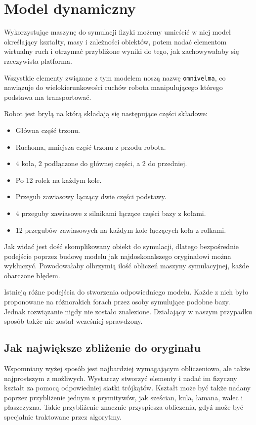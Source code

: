 \section{Model dynamiczny}
	\label{sec:omnivelma}
	Wykorzystując maszynę do symulacji fizyki możemy umieścić w niej model określający kształty, masy i zależności obiektów, potem nadać elementom wirtualny ruch i otrzymać przybliżone wyniki do tego, jak zachowywałaby się rzeczywista platforma.

	Wszystkie elementy związane z tym modelem noszą nazwę \texttt{omnivelma}, co nawiązuje do wielokierunkowości ruchów robota manipulującego którego podstawa ma transportować.

	Robot jest bryłą na którą składają się następujące części składowe:
	\begin{itemize}
	\item Główna część trzonu.
	\item Ruchoma, mniejsza część trzonu z przodu robota.
	\item 4 koła, 2 podłączone do głównej części, a 2 do przedniej.
	\item Po 12 rolek na każdym kole.
	\item Przegub zawiasowy łączący dwie części podstawy.
	\item 4 przeguby zawiasowe z silnikami łączące części bazy z kołami.
	\item 12 przegubów zawiasowych na każdym kole łączących koła z rolkami.
	\end{itemize}

	Jak widać jest dość skomplikowany obiekt do symulacji, dlatego bezpośrednie podejście poprzez budowę modelu jak najdoskonalszego oryginałowi można wykluczyć.
	Powodowałaby olbrzymią ilość obliczeń maszyny symulacyjnej, każde obarczone błędem.

	Istnieją różne podejścia do stworzenia odpowiedniego modelu. Każde z nich było proponowane na różnorakich forach przez osoby symulujące podobne bazy.
	Jednak rozwiązanie nigdy nie zostało znalezione.
	Działający w naszym przypadku sposób także nie został wcześniej sprawdzony.

	\subsection{Jak największe zbliżenie do oryginału}
		Wspomniany wyżej sposób jest najbardziej wymagającym obliczeniowo, ale także najprostszym z możliwych.
		Wystarczy stworzyć elementy i nadać im fizyczny kształt za pomocą odpowiedniej siatki trójkątów.
		Kształt może być także nadany poprzez przybliżenie jednym z prymitywów, jak sześcian, kula, łamana, walec i płaszczyzna.
		Takie przybliżenie znacznie przyspiesza obliczenia, gdyż może być specjalnie traktowane przez algorytmy.

